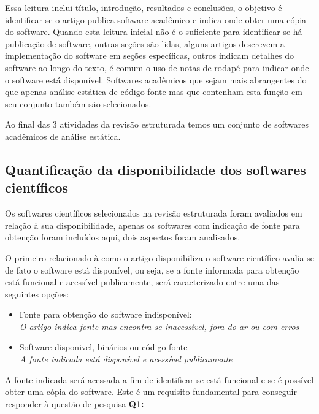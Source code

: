 \begin{description}
    Essa leitura inclui título, introdução, resultados e conclusões, o objetivo
    é identificar se o artigo publica software acadêmico e indica onde obter
    uma cópia do software. Quando esta leitura inicial não é o suficiente para
    identificar se há publicação de software, outras seções são lidas, alguns
    artigos descrevem a implementação do software em seções específicas, outros
    indicam detalhes do software ao longo do texto, é comum o uso de
    notas de rodapé para indicar onde o software está disponível. Softwares
    acadêmicos que sejam mais abrangentes do que apenas análise estática de
    código fonte mas que contenham esta função em seu conjunto também são
    selecionados.

\end{description}

Ao final das 3 atividades da revisão estruturada temos um conjunto de softwares
acadêmicos de análise estática.

\subsection{Quantificação da disponibilidade dos softwares científicos}

Os softwares científicos selecionados na revisão estruturada foram avaliados em
relação à sua disponibilidade, apenas os softwares com indicação de fonte para
obtenção foram incluídos aqui, dois aspectos foram analisados.

O primeiro relacionado à como o artigo disponibiliza o software científico
avalia se de fato o software está disponível, ou seja, se a fonte informada
para obtenção está funcional e acessível publicamente, será caracterizado entre
uma das seguintes opções:

\begin{itemize}
  \item Fonte para obtenção do software indisponível:\\
    {\it O artigo indica fonte mas encontra-se inacessível, fora do ar ou com erros}
  \item Software disponivel, binários ou código fonte\\
    {\it A fonte indicada está disponível e acessível publicamente}
\end{itemize}

A fonte indicada será acessada a fim de identificar se está funcional e se é
possível obter uma cópia do software. Este é um requisito fundamental para
conseguir responder à questão de pesquisa {\bf Q1:} \QuestaoUm

